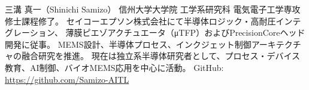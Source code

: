\documentclass[conference]{IEEEtran}
\begin{document}
\begin{IEEEbiography}{三溝 真一（Shinichi Samizo）}
信州大学大学院 工学系研究科 電気電子工学専攻 修士課程修了。  
セイコーエプソン株式会社にて半導体ロジック・高耐圧インテグレーション、
薄膜ピエゾアクチュエータ（μTFP）およびPrecisionCoreヘッド開発に従事。  
MEMS設計、半導体プロセス、インクジェット制御アーキテクチャの融合研究を推進。  
現在は独立系半導体研究者として、プロセス・デバイス教育、AI制御、バイオMEMS応用を中心に活動。  
GitHub: \url{https://github.com/Samizo-AITL}
\end{IEEEbiography}

\balance
\end{document}
